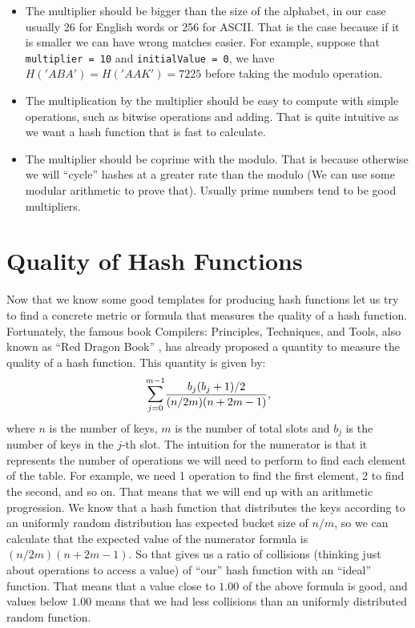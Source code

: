 \begin{itemize}
\item The multiplier should be bigger than the size of the alphabet, in our case usually 26 for English words or 256 for ASCII. That is the case because if it is smaller we can have wrong matches easier. For example, suppose that \texttt{multiplier = 10} and \texttt{initialValue = 0}, we have \( H('ABA') = H('AAK') = 7225 \) before taking the modulo operation.

\item The multiplication by the multiplier should be easy to compute with simple operations, such as bitwise operations and adding. That is quite intuitive as we want a hash function that is fast to calculate. 

\item The multiplier should be coprime with the modulo. That is because otherwise we will ``cycle'' hashes at a greater rate than the modulo (We can use some modular arithmetic to prove that). Usually prime numbers tend to be good multipliers.
\end{itemize}

\section{Quality of Hash Functions}

Now that we know some good templates for producing hash functions let us try to find a concrete metric or formula that measures the quality of a hash function. Fortunately, the famous book Compilers: Principles, Techniques, and Tools, also known as ``Red Dragon Book'' \citep{DragonBook}, has already proposed a quantity to measure the quality of a hash function. This quantity is given by:
\[ \mathlarger{\sum}_{j = 0}^{m - 1} \frac{b_j(b_j + 1)/2}{ (n/2m)(n + 2m - 1) }, \]
where \( n \) is the number of keys, \( m \) is the number of total slots and \( b_j \) is the number of keys in the \( j \)-th slot. The intuition for the numerator is that it represents the number of operations we will need to perform to find each element of the table. For example, we need 1 operation to find the first element, 2 to find the second, and so on. That means that we will end up with an arithmetic progression. We know that a hash function that distributes the keys according to an uniformly random distribution has expected bucket size of \( n / m \), so we can calculate that the expected value of the numerator formula is \( (n/2m)(n + 2m - 1) \). So that gives us a ratio of collisions (thinking just about operations to access a value) of ``our'' hash function with an ``ideal'' function. That means that a value close to \( 1.00 \) of the above formula is good, and values below \( 1.00 \) means that we had less collisions than an uniformly distributed random function.

